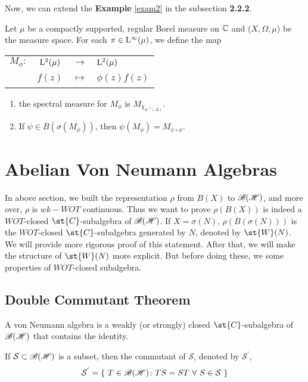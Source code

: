 Now, we can extend the \textbf{Example} \ref{exam2} in the subsection \textbf{2.2.2}.

\begin{exam}
	Let $\mu$ be a compactly supported, regular Borel measure on $\mathbb{C}$ and ($X,\Omega,\mu$) be the measure space. For each $\pi \in \mathrm{L^{\infty}}(\mu)$, we define the map
	\begin{center}
		\begin{tabular}{l c c l}
			$M_{\phi} \colon$ & $\mathrm{L^{2}}(\mu)$ & $\longrightarrow$ & $\mathrm{L^{2}}(\mu)$ \\
			~ & $f(z)$ & $\longmapsto$ & $\phi(z)f(z)$
		\end{tabular} 
	\end{center}
	\begin{enumerate}[label=\arabic*)]
		\item the spectral measure for $M_{\phi}$ is $M_{\chi_{\phi^{-1}(\Delta)}}$.
		\item If $\psi \in B(\sigma(M_{\phi}))$, then $\psi(M_{\phi}) = M_{\psi \circ \phi}$.
	\end{enumerate}
\end{exam}

\section{Abelian Von Neumann Algebras}

In above section, we built the representation $\rho$ from $B(X)$ to $\mathscr{B(H)}$, and more over, $\rho$ is $wk-WOT$ continuous. Thus we want to prove $\rho(B(X))$ is indeed a $WOT$-closed $\st{C}$-subalgebra of $\mathscr{B(H)}$. If $X = \sigma(N)$, $\rho(B(\sigma(N)))$ is the $WOT$-closed $\st{C}$-subalgebra generated by $N$, denoted by $\st{W}(N)$. We will provide more rigorous proof of this statement. After that, we will make the structure of $\st{W}(N)$ more explicit. But before doing these, we some properties of $WOT$-closed subalgebra.

\subsection{Double Commutant Theorem}

\begin{defn}
	A von Neumann algebra is a weakly (or strongly) closed $\st{C}$-subalgebra of $\mathscr{B(H)}$ that contains the identity.
\end{defn}

\begin{defn}
	If $\mathcal{S} \subset \mathscr{B(H)}$ is a subset, then the commutant of $\mathcal{S}$, denoted by $\mathcal{S}^{'}$,
	\begin{equation*}
		\mathcal{S}^{'} = \{~ T\in \mathscr{B(H)} \colon TS=ST~\forall~S \in \mathcal{S} ~\}
	\end{equation*}
\end{defn}

